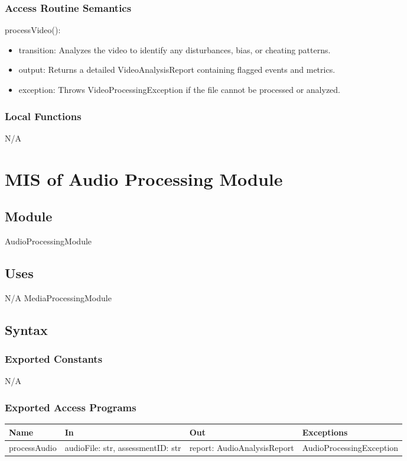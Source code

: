 \documentclass[12pt, titlepage]{article}
\begin{document}
\subsubsection{Access Routine Semantics}

\noindent processVideo():
\begin{itemize}
\item transition: Analyzes the video to identify any disturbances, bias, or cheating patterns.
\item output: Returns a detailed VideoAnalysisReport containing flagged events and metrics.
\item exception: Throws VideoProcessingException if the file cannot be processed or analyzed.
\end{itemize}

\subsubsection{Local Functions}
N/A
\section{MIS of Audio Processing Module} \label{AudioProcessingModule}

\subsection{Module}
AudioProcessingModule

\subsection{Uses}
N/A
MediaProcessingModule

\subsection{Syntax}

\subsubsection{Exported Constants}
N/A

\subsubsection{Exported Access Programs}

\begin{center}
  \begin{tabular}{p{3cm} p{4cm} p{4cm} p{5cm}}
  \hline
  \textbf{Name} & \textbf{In} & \textbf{Out} & \textbf{Exceptions} \\
  \hline
  processAudio & \raggedright\arraybackslash audioFile: str, assessmentID: str & \raggedright\arraybackslash report: AudioAnalysisReport & \raggedright\arraybackslash AudioProcessingException \\
  \end{tabular}
\end{center}
\end{document}

